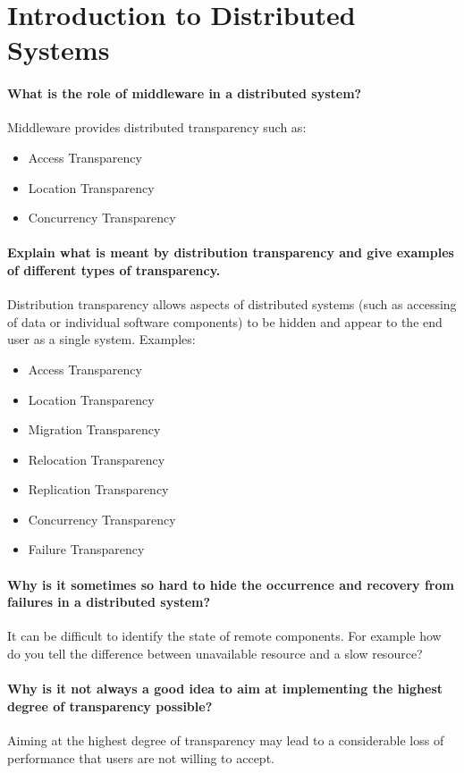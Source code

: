 \section{Introduction to Distributed Systems}
\paragraph{What is the role of middleware in a distributed system?}
Middleware provides distributed transparency such as:
\begin{itemize}
	\item Access Transparency
	\item Location Transparency
	\item Concurrency Transparency	
\end{itemize}

\paragraph{Explain what is meant by distribution transparency and give examples of different types of transparency.}
Distribution transparency allows aspects of distributed systems (such as accessing of data or individual software components) to be hidden and appear to the end user as a single system. Examples:
\begin{itemize}
	\item Access Transparency
	\item Location Transparency
	\item Migration Transparency
	\item Relocation Transparency
	\item Replication Transparency
	\item Concurrency Transparency
	\item Failure Transparency	
\end{itemize}

\paragraph{Why is it sometimes so hard to hide the occurrence and recovery from failures in a distributed system?}
It can be difficult to identify the state of remote components. For example how do you tell the difference between unavailable resource and a slow resource?

\paragraph{Why is it not always a good idea to aim at implementing the highest degree of transparency possible?}
Aiming at the highest degree of transparency may lead to a considerable loss of performance that users are not willing to accept.

